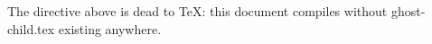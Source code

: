 \documentclass{article}
\begin{document}
The directive above is dead to TeX: this document compiles without
ghost-child.tex existing anywhere.
\end{document}
